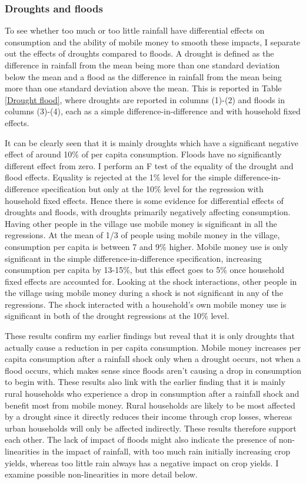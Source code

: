 \subsubsection{Droughts and floods}
To see whether too much or too little rainfall have differential effects on consumption and the ability of mobile money to smooth these impacts, I separate out the effects of droughts compared to floods. A drought is defined as the difference in rainfall from the mean being more than one standard deviation below the mean and a flood as the difference in rainfall from the mean being more than one standard deviation above the mean. This is reported in Table \ref{Drought flood}, where droughts are reported in columns (1)-(2) and floods in columns (3)-(4), each as a simple difference-in-difference and with household fixed effects. 

It can be clearly seen that it is mainly droughts which have a significant negative effect of around 10\% of per capita consumption. Floods have no significantly different effect from zero. I perform an F test of the equality of the drought and flood effects. Equality is rejected at the 1\% level  for the simple difference-in-difference specification but only at the 10\% level for the regression with household fixed effects. Hence there is some evidence for differential effects of droughts and floods, with droughts primarily negatively affecting consumption. Having other people in the village use mobile money is significant in all the regressions. At the mean of 1/3 of people using mobile money in the village, consumption per capita is between 7 and 9\% higher. Mobile money use is only significant in the simple difference-in-difference specification, increasing consumption per capita by 13-15\%, but this effect goes to 5\% once household fixed effects are accounted for. Looking at the shock interactions, other people in the village using mobile money during a shock is not significant in any of the regressions. The shock interacted with a household's own mobile money use is significant in both of the drought regressions at the 10\% level. 

These results confirm my earlier findings but reveal that it is only droughts that actually cause a reduction in per capita consumption. Mobile money increases per capita consumption after a rainfall shock only when a drought  occurs, not when a flood occurs, which makes sense since floods aren't causing a drop in consumption to begin with. These results also link with the earlier finding that it is mainly rural households who experience a drop in consumption after a rainfall shock and benefit most from mobile money. Rural households are likely to be most affected by a drought since it directly reduces their income through crop losses, whereas urban households will only be affected indirectly. These results therefore support each other. The lack of impact of floods might also indicate the presence of non-linearities in the impact of rainfall, with too much rain initially increasing crop yields, whereas too little rain always has a negative impact on crop yields. I examine possible non-linearities in more detail below.

